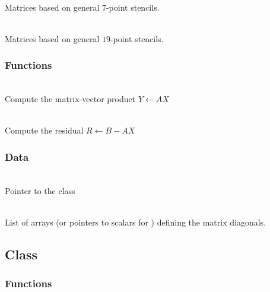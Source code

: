 \documentclass[11pt]{article}
\begin{document}
     \\
      Matrices based on general $7$-point stencils.

     \\
      Matrices based on general $19$-point stencils.

  
\subsubsection{ Functions}

     \\ Compute the matrix-vector product $Y \leftarrow A X$

     \\ Compute the residual $R \leftarrow B - A X$

\subsubsection{ Data}

     \\
    Pointer to the  class

     \\
    List of arrays (or pointers to scalars for ) defining
    the matrix diagonals.

\subsection{ Class} \label{ss:stencil}

\subsubsection{ Functions}
\end{document}
